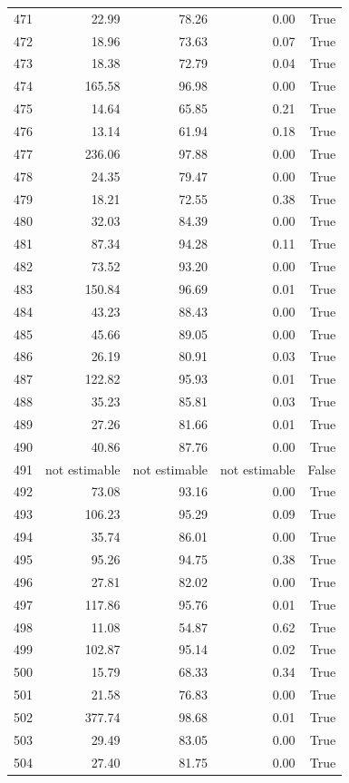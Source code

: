 \begin{longtable}{rrrrr}
471 & 22.99 & 78.26 & 0.00 & True \\
472 & 18.96 & 73.63 & 0.07 & True \\
473 & 18.38 & 72.79 & 0.04 & True \\
474 & 165.58 & 96.98 & 0.00 & True \\
475 & 14.64 & 65.85 & 0.21 & True \\
476 & 13.14 & 61.94 & 0.18 & True \\
477 & 236.06 & 97.88 & 0.00 & True \\
478 & 24.35 & 79.47 & 0.00 & True \\
479 & 18.21 & 72.55 & 0.38 & True \\
480 & 32.03 & 84.39 & 0.00 & True \\
481 & 87.34 & 94.28 & 0.11 & True \\
482 & 73.52 & 93.20 & 0.00 & True \\
483 & 150.84 & 96.69 & 0.01 & True \\
484 & 43.23 & 88.43 & 0.00 & True \\
485 & 45.66 & 89.05 & 0.00 & True \\
486 & 26.19 & 80.91 & 0.03 & True \\
487 & 122.82 & 95.93 & 0.01 & True \\
488 & 35.23 & 85.81 & 0.03 & True \\
489 & 27.26 & 81.66 & 0.01 & True \\
490 & 40.86 & 87.76 & 0.00 & True \\
491 & not estimable & not estimable & not estimable & False \\
492 & 73.08 & 93.16 & 0.00 & True \\
493 & 106.23 & 95.29 & 0.09 & True \\
494 & 35.74 & 86.01 & 0.00 & True \\
495 & 95.26 & 94.75 & 0.38 & True \\
496 & 27.81 & 82.02 & 0.00 & True \\
497 & 117.86 & 95.76 & 0.01 & True \\
498 & 11.08 & 54.87 & 0.62 & True \\
499 & 102.87 & 95.14 & 0.02 & True \\
500 & 15.79 & 68.33 & 0.34 & True \\
501 & 21.58 & 76.83 & 0.00 & True \\
502 & 377.74 & 98.68 & 0.01 & True \\
503 & 29.49 & 83.05 & 0.00 & True \\
504 & 27.40 & 81.75 & 0.00 & True \\

\end{longtable}

